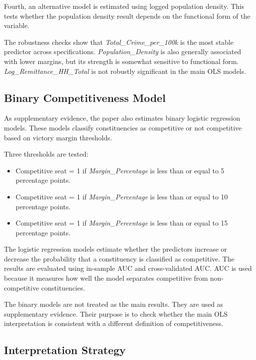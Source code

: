 \documentclass[12pt,a4paper]{article}
\begin{document}
Fourth, an alternative model is estimated using logged population density. This tests whether the population density result depends on the functional form of the variable.

The robustness checks show that \textit{Total\_Crime\_per\_100k} is the most stable predictor across specifications. \textit{Population\_Density} is also generally associated with lower margins, but its strength is somewhat sensitive to functional form. \textit{Log\_Remittance\_HH\_Total} is not robustly significant in the main OLS models.

\subsection{Binary Competitiveness Model}

As supplementary evidence, the paper also estimates binary logistic regression models. These models classify constituencies as competitive or not competitive based on victory margin thresholds.

Three thresholds are tested:

\begin{itemize}
    \item Competitive seat = 1 if \textit{Margin\_Percentage} is less than or equal to 5 percentage points.
    \item Competitive seat = 1 if \textit{Margin\_Percentage} is less than or equal to 10 percentage points.
    \item Competitive seat = 1 if \textit{Margin\_Percentage} is less than or equal to 15 percentage points.
\end{itemize}

The logistic regression models estimate whether the predictors increase or decrease the probability that a constituency is classified as competitive. The results are evaluated using in-sample AUC and cross-validated AUC. AUC is used because it measures how well the model separates competitive from non-competitive constituencies.

The binary models are not treated as the main results. They are used as supplementary evidence. Their purpose is to check whether the main OLS interpretation is consistent with a different definition of competitiveness.

\subsection{Interpretation Strategy}
\end{document}
